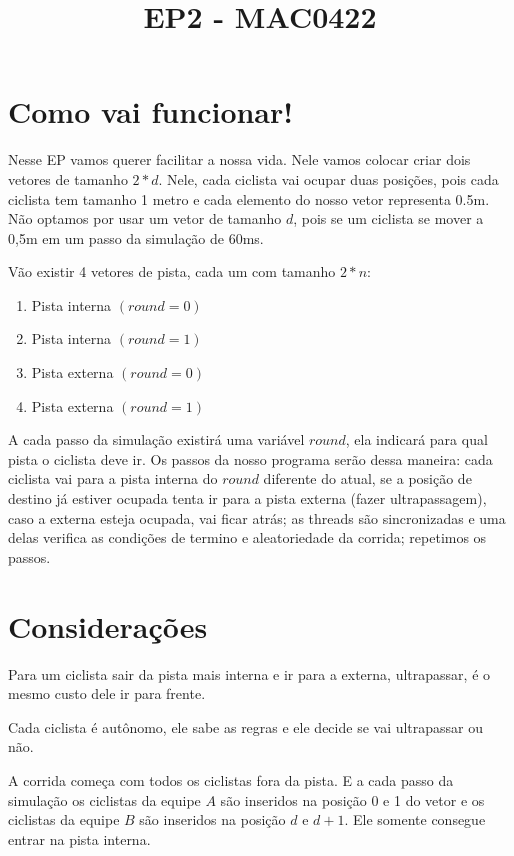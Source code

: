 \documentclass[]{scrartcl}
\title{EP2 - MAC0422}
\author{}
\begin{document}
\maketitle 

\begin{abstract}

\end{abstract}

\section{Como vai funcionar!}

Nesse EP vamos querer facilitar a nossa vida. Nele vamos colocar criar dois vetores de tamanho $2*d$. Nele, cada ciclista vai ocupar duas posições, pois cada ciclista tem tamanho 1 metro e cada elemento do nosso vetor representa 0.5m. Não optamos por usar um vetor de tamanho $d$, pois se um ciclista se mover a 0,5m em um passo da simulação de 60ms.

Vão existir 4 vetores de pista, cada um com tamanho $2*n$:

\begin{enumerate}
	\item Pista interna $(round = 0)$
	\item Pista interna $(round = 1)$
	\item Pista externa $(round = 0)$
	\item Pista externa $(round = 1)$
\end{enumerate}

A cada passo da simulação existirá uma variável $round$, ela indicará para qual pista o ciclista deve ir. Os passos da nosso programa serão dessa maneira: cada ciclista vai para a pista interna do $round$ diferente do atual, se a posição de destino já estiver ocupada tenta ir para a pista externa (fazer ultrapassagem), caso a externa esteja ocupada, vai ficar atrás; as threads são sincronizadas e uma delas verifica as condições de termino e aleatoriedade da corrida; repetimos os passos.


\section{Considerações}
Para um ciclista sair da pista mais interna e ir para a externa, ultrapassar, é o mesmo custo dele ir para frente.

Cada ciclista é autônomo, ele sabe as regras e ele decide se vai ultrapassar ou não.

A corrida começa com todos os ciclistas fora da pista. E a cada passo da simulação os ciclistas da equipe $A$ são inseridos na posição 0 e 1 do vetor e os ciclistas da equipe $B$ são inseridos na posição $d$ e $d+1$. Ele somente consegue entrar na pista interna.
\end{document}
